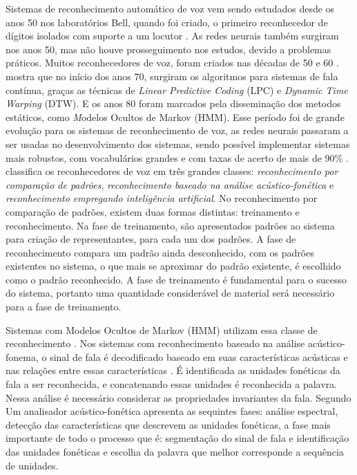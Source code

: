 Sistemas de reconhecimento automático de voz vem sendo estudados desde os anos 50 nos laboratórios Bell, quando foi criado, o primeiro reconhecedor de dígitos isolados com suporte a um locutor \cite{MetodosProAnderson}. As redes neurais também surgiram nos anos 50, mas não houve prosseguimento nos estudos, devido a problemas práticos. Muitos reconhecedores de voz, foram criados nas décadas de 50 e 60 \cite{RavSpeechSadaoki}.  mostra que no início dos anos 70, surgiram os algoritmos para sistemas de fala contínua, graças as técnicas de \textit{Linear Predictive Coding} (LPC) e \textit{Dynamic Time Warping} (DTW). E os anos 80 foram marcados pela disseminação dos metodos estáticos, como \textit Modelos Ocultos de Markov (HMM). Esse período foi de grande evolução para os sistemas de reconhecimento de voz, as redes neurais passaram a ser usadas no desenvolvimento dos sistemas, sendo possível implementar sistemas mais robustos, com vocabulários grandes e com taxas de acerto de mais de 90{\%} \cite{AvaliaTecJose}.
 classifica os reconhecedores de voz em três grandes classes: \textit{reconhecimento por comparação de padrões}, \textit{reconhecimento baseado na análise acústico-fonética} e \textit{reconhecimento empregando inteligência artificial}. No reconhecimento por comparação de padrões, existem duas formas distintas: treinamento e reconhecimento. Na fase de treinamento, são apresentados padrões ao sistema para criação de representantes, para cada um dos padrões. A fase de reconhecimento compara um padrão ainda desconhecido, com os padrões existentes no sistema, o que mais se aproximar do padrão existente, é escolhido como o padrão reconhecido. A fase de treinamento é fundamental para o sucesso do sistema, portanto uma quantidade considerável de material será necessário para a fase de treinamento. 

Sistemas com Modelos Ocultos de Markov (HMM) utilizam essa classe de reconhecimento \cite{AvaliaTecJose}. Nos sistemas com reconhecimento baseado na análise acústico-fonema, o sinal de fala é decodificado baseado em suas características acústicas e nas relações entre essas características \cite{DigSpeechNejat}. É identificada as unidades fonéticas da fala a ser reconhecida, e concatenando essas unidades é reconhecida a palavra. Nessa análise é necessário considerar as propriedades invariantes da fala. Segundo  Um analisador acústico-fonética apresenta as sequintes fases: análise espectral, detecção das características que descrevem as unidades fonéticas, a fase mais importante de todo o processo que é: segmentação do sinal de fala e identificação das unidades fonéticas e escolha da palavra que melhor corresponde a sequência de unidades. 

